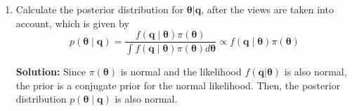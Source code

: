\documentclass[13pt]{article}
\theoremstyle{definition}
\newenvironment{solution}
{\color{C2}\begin{framed}\begingroup\textbf{Solution:} }
  {\endgroup\end{framed}}
\theoremstyle{remark}
\begin{document}
\begin{enumerate}
    \item Calculate the posterior distribution for $\boldsymbol{\theta}|\bm{q}$, after the views are taken into account, which is given by
$$
p(\boldsymbol{\theta} \mid \boldsymbol{q})=\frac{f(\boldsymbol{q} \mid \boldsymbol{\theta}) \pi(\boldsymbol{\theta})}{\int f(\boldsymbol{q} \mid \boldsymbol{\theta}) \pi(\boldsymbol{\theta}) d \boldsymbol{\theta}}\propto f(\boldsymbol{q} \mid \boldsymbol{\theta}) \pi(\boldsymbol{\theta})
$$
\begin{solution}
    Since $\pi(\bm{\theta})$ is normal and the likelihood $f(\boldsymbol{q} | \boldsymbol{\theta})$ is also normal, the prior is a conjugate prior for the normal likelihood. Then, the posterior distribution $p(\boldsymbol{\theta} \mid \boldsymbol{q})$ is also normal.


\end{solution}
\end{enumerate}
\end{document}

